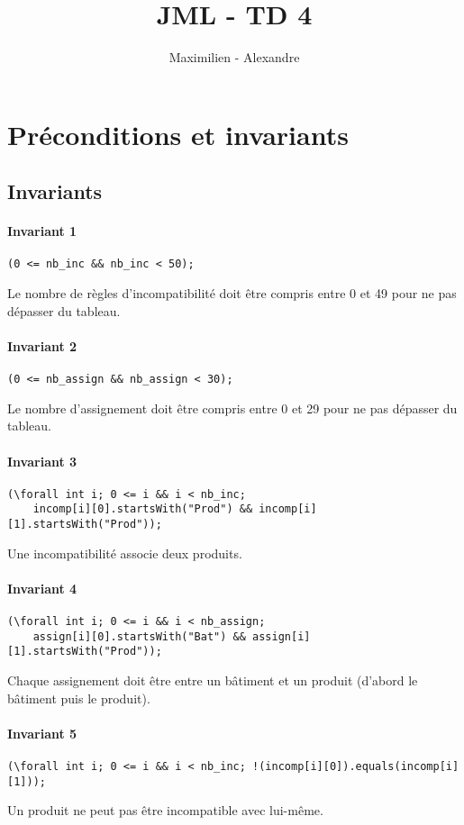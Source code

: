 \documentclass{report}[12pt]
\title{JML - TD 4}
\author{Maximilien \bsc{Faure} - Alexandre \bsc{Sahuc}}
\begin{document}
\maketitle

\section{Préconditions et invariants}
\subsection{Invariants}
\paragraph{Invariant 1}
\begin{lstlisting}
(0 <= nb_inc && nb_inc < 50);
\end{lstlisting}
Le nombre de règles d'incompatibilité doit être compris entre 0 et 49 pour ne pas dépasser du tableau.

\paragraph{Invariant 2}
\begin{lstlisting}
(0 <= nb_assign && nb_assign < 30);
\end{lstlisting}
Le nombre d'assignement doit être compris entre 0 et 29 pour ne pas dépasser du tableau.

\paragraph{Invariant 3}
\begin{lstlisting}
(\forall int i; 0 <= i && i < nb_inc; 
	incomp[i][0].startsWith("Prod") && incomp[i][1].startsWith("Prod"));
\end{lstlisting}
Une incompatibilité associe deux produits.

\paragraph{Invariant 4}
\begin{lstlisting}
(\forall int i; 0 <= i && i < nb_assign; 
	assign[i][0].startsWith("Bat") && assign[i][1].startsWith("Prod"));
\end{lstlisting}
Chaque assignement doit être entre un bâtiment et un produit (d'abord le bâtiment puis le produit).

\paragraph{Invariant 5}
\begin{lstlisting}
(\forall int i; 0 <= i && i < nb_inc; !(incomp[i][0]).equals(incomp[i][1]));
\end{lstlisting}
Un produit ne peut pas être incompatible avec lui-même.
\end{document}
